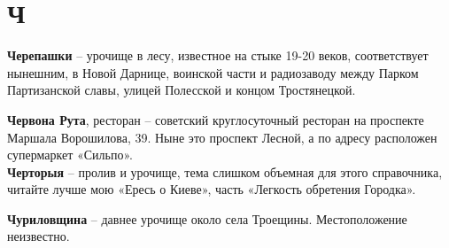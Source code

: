 \chapter*{Ч}

\textbf{Черепашки} – урочище в лесу, известное на стыке 19-20 веков, соответствует нынешним, в Новой Дарнице, воинской части и радиозаводу между Парком Партизанской славы, улицей Полесской и концом Тростянецкой.\\

\medskip

\textbf{Червона Рута}, ресторан – советский круглосуточный ресторан на проспекте Маршала Ворошилова, 39. Ныне это проспект Лесной, а по адресу расположен супермаркет «Сильпо».\\

\textbf{Черторыя} – пролив и урочище, тема слишком объемная для этого справочника, читайте лучше мою «Ересь о Киеве», часть «Легкость обретения Городка».

\medskip

\textbf{Чуриловщина} – давнее урочище около села Троещины. Местоположение неизвестно.\\